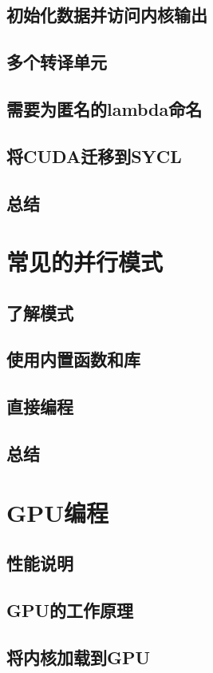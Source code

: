 \documentclass[11pt,a4paper,UTF8]{ctexart}
\begin{document}
		\subsection{初始化数据并访问内核输出}
		\subsection{多个转译单元}
		\subsection{需要为匿名的lambda命名}
		\subsection{将CUDA迁移到SYCL}
		\subsection{总结}
	\section{常见的并行模式}
		\subsection{了解模式}
		\subsection{使用内置函数和库}
		\subsection{直接编程}
		\subsection{总结}
	\section{GPU编程}
		\subsection{性能说明}
		\subsection{GPU的工作原理}
		\subsection{将内核加载到GPU}
\end{document}
